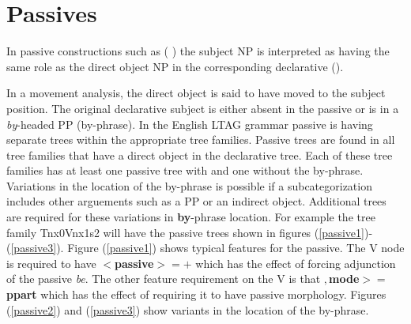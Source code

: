 \section{Passives}

In passive constructions such as ( ) the subject NP is
interpreted as having the same role as the direct object NP in the
corresponding declarative  ().


 In a movement analysis, the direct object is said to have moved to
the subject position.  The original declarative subject is either
absent in the passive or is in a {\it by}-headed PP (by-phrase). In
the English LTAG grammar passive is having separate trees within the
appropriate tree families.  Passive trees are found in all tree
families that have a direct object in the declarative tree. Each of
these tree families has at least one passive tree with and one without
the by-phrase. Variations in the location of the by-phrase is possible
if a subcategorization includes other arguements such as a PP or
an indirect object. Additional trees are required for these variations
in {\bf by}-phrase location.  For example the tree family Tnx0Vnx1s2 will have
the passive trees shown in figures (\ref{passive1})-
(\ref{passive3}). Figure (\ref{passive1}) shows typical features for
the passive. The V node is required to have {\bf $<$passive$>=+$}
which has the effect of forcing adjunction of the passive {\it be}.
The other feature requirement on the V is that {\bf $,$mode$>=$ppart}
which has the effect of requiring it to have passive morphology.  Figures
(\ref{passive2}) and (\ref{passive3}) show variants in the location of
the by-phrase.

 
\begin{figure}[htbp]
\end{figure}

\begin{figure}[htbp]
\end{figure}


\begin{figure}[htbp]
\end{figure}






